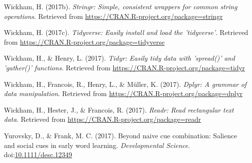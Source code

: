 \documentclass[man]{apa6}
\theoremstyle{definition}
\theoremstyle{definition}
\theoremstyle{definition}
\theoremstyle{remark}
\begin{document}
\hypertarget{ref-R-stringr}{}
Wickham, H. (2017b). \emph{Stringr: Simple, consistent wrappers for
common string operations}. Retrieved from
\url{https://CRAN.R-project.org/package=stringr}

\hypertarget{ref-R-tidyverse}{}
Wickham, H. (2017c). \emph{Tidyverse: Easily install and load the
'tidyverse'}. Retrieved from
\url{https://CRAN.R-project.org/package=tidyverse}

\hypertarget{ref-R-tidyr}{}
Wickham, H., \& Henry, L. (2017). \emph{Tidyr: Easily tidy data with
'spread()' and 'gather()' functions}. Retrieved from
\url{https://CRAN.R-project.org/package=tidyr}

\hypertarget{ref-R-dplyr}{}
Wickham, H., Francois, R., Henry, L., \& Müller, K. (2017). \emph{Dplyr:
A grammar of data manipulation}. Retrieved from
\url{https://CRAN.R-project.org/package=dplyr}

\hypertarget{ref-R-readr}{}
Wickham, H., Hester, J., \& Francois, R. (2017). \emph{Readr: Read
rectangular text data}. Retrieved from
\url{https://CRAN.R-project.org/package=readr}

\hypertarget{ref-yurovsky2017}{}
Yurovsky, D., \& Frank, M. C. (2017). Beyond naive cue combination:
Salience and social cues in early word learning. \emph{Developmental
Science}.
doi:\href{https://doi.org/10.1111/desc.12349}{10.1111/desc.12349}
\end{document}
